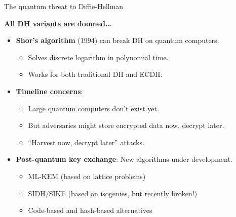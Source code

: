 \documentclass[aspectratio=169, lualatex, handout]{beamer}
\begin{document}
\begin{frame}{The quantum threat to Diffie-Hellman}
	\begin{center}
		\Large\textbf{All DH variants are doomed\ldots}
	\end{center}
	\vspace{0.1cm}
	\begin{itemize}[<+->]
		\item \textbf{Shor's algorithm} (1994) can break DH on quantum computers.
		      \begin{itemize}
			      \item Solves discrete logarithm in polynomial time.
			      \item Works for both traditional DH and ECDH.
		      \end{itemize}
		\item \textbf{Timeline concerns}:
		      \begin{itemize}
			      \item Large quantum computers don't exist yet.
			      \item But adversaries might store encrypted data now, decrypt later.
			      \item ``Harvest now, decrypt later'' attacks.
		      \end{itemize}
		\item \textbf{Post-quantum key exchange}: New algorithms under development.
		      \begin{itemize}
			      \item ML-KEM (based on lattice problems)
			      \item SIDH/SIKE (based on isogenies, but recently broken!)
			      \item Code-based and hash-based alternatives
		      \end{itemize}
	\end{itemize}
\end{frame}
\end{document}
